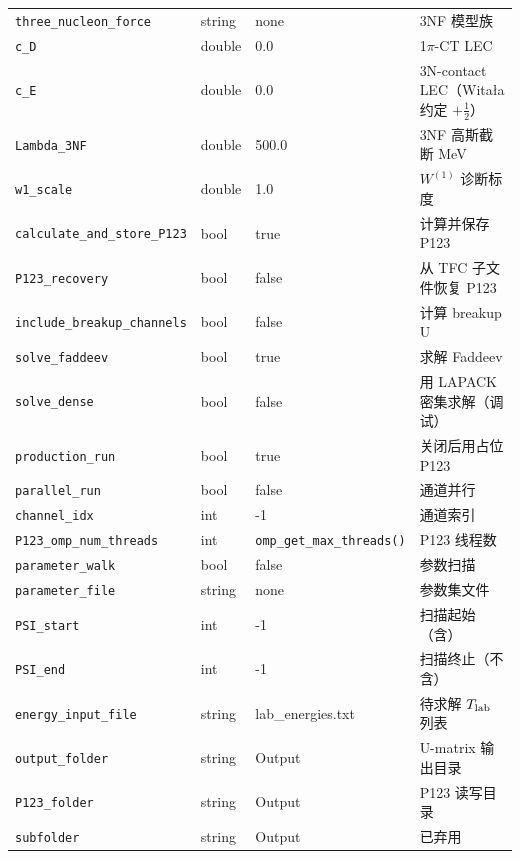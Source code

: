 \begin{longtable}{lll@{\hskip 1em}p{4.7cm}}
\texttt{three\_nucleon\_force}      & string & none         & 3NF 模型族 \\
\texttt{c\_D}                      & double & 0.0          & 1\(\pi\)-CT LEC \\
\texttt{c\_E}                      & double & 0.0          & 3N-contact LEC（Witała 约定 \(+\tfrac12\)） \\
\texttt{Lambda\_3NF}               & double & 500.0        & 3NF 高斯截断 \si{MeV} \\
\texttt{w1\_scale}                 & double & 1.0          & \(W^{(1)}\) 诊断标度 \\
\texttt{calculate\_and\_store\_P123} & bool   & true         & 计算并保存 P123 \\
\texttt{P123\_recovery}            & bool   & false        & 从 TFC 子文件恢复 P123 \\
\texttt{include\_breakup\_channels} & bool   & false        & 计算 breakup U \\
\texttt{solve\_faddeev}            & bool   & true         & 求解 Faddeev \\
\texttt{solve\_dense}              & bool   & false        & 用 LAPACK 密集求解（调试） \\
\texttt{production\_run}           & bool   & true         & 关闭后用占位 P123 \\
\texttt{parallel\_run}             & bool   & false        & 通道并行 \\
\texttt{channel\_idx}              & int    & -1           & 通道索引 \\
\texttt{P123\_omp\_num\_threads}     & int    & \texttt{omp\_get\_max\_threads()} & P123 线程数 \\
\texttt{parameter\_walk}           & bool   & false        & 参数扫描 \\
\texttt{parameter\_file}           & string & none         & 参数集文件 \\
\texttt{PSI\_start}                & int    & -1           & 扫描起始（含） \\
\texttt{PSI\_end}                  & int    & -1           & 扫描终止（不含） \\
\texttt{energy\_input\_file}        & string & lab\_energies.txt & 待求解 \({T_{\text{lab}}}\) 列表 \\
\texttt{output\_folder}            & string & Output       & U-matrix 输出目录 \\
\texttt{P123\_folder}              & string & Output       & P123 读写目录 \\
\texttt{subfolder}                & string & Output       & 已弃用 \\
\bottomrule
\end{longtable}

